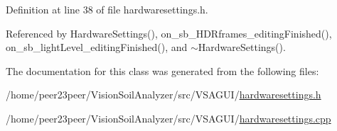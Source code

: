 Definition at line 38 of file hardwaresettings.\+h.



Referenced by Hardware\+Settings(), on\+\_\+sb\+\_\+\+H\+D\+Rframes\+\_\+editing\+Finished(), on\+\_\+sb\+\_\+light\+Level\+\_\+editing\+Finished(), and $\sim$\+Hardware\+Settings().



The documentation for this class was generated from the following files\+:\begin{DoxyCompactItemize}
\item 
/home/peer23peer/\+Vision\+Soil\+Analyzer/src/\+V\+S\+A\+G\+U\+I/\hyperlink{hardwaresettings_8h}{hardwaresettings.\+h}\item 
/home/peer23peer/\+Vision\+Soil\+Analyzer/src/\+V\+S\+A\+G\+U\+I/\hyperlink{hardwaresettings_8cpp}{hardwaresettings.\+cpp}\end{DoxyCompactItemize}
